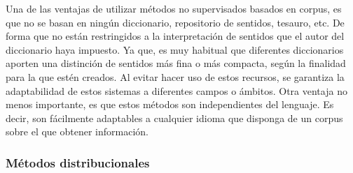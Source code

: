 Una de las ventajas de utilizar métodos no supervisados basados en corpus, es que no se basan en ningún diccionario, repositorio de sentidos, tesauro, etc. De forma que no están restringidos a la interpretación de sentidos que el autor del diccionario haya impuesto. Ya que, es muy habitual que diferentes diccionarios aporten una distinción de sentidos más fina o más compacta, según la finalidad para la que estén creados. Al evitar hacer uso de estos recursos, se garantiza la adaptabilidad de estos sistemas a diferentes campos o ámbitos. Otra ventaja no menos importante, es que estos métodos son independientes del lenguaje. Es decir, son fácilmente adaptables a cualquier idioma que disponga de un corpus sobre el que obtener información.

\subsubsection{Métodos distribucionales}
